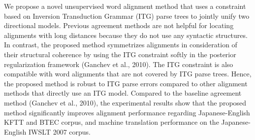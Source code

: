 We propose a novel unsupervised word alignment method that uses a constraint based on Inversion Transduction Grammar (ITG) parse trees to jointly unify two directional models. Previous agreement methods are not helpful for locating alignments with long distances because they do not use any syntactic structures. In contrast, the proposed method symmetrizes alignments in consideration of their structural coherence by using the ITG constraint softly in the posterior regularization framework (Ganchev et al., 2010). The ITG constraint is also compatible with word alignments that are not covered by ITG parse trees. Hence, the proposed method is robust to ITG parse errors compared to other alignment methods that directly use an ITG model. Compared to the baseline agreement method (Ganchev et al., 2010), the experimental results show that the proposed method significantly improves alignment performance regarding Japanese-English KFTT and BTEC corpus, and machine translation performance on the Japanese-English IWSLT 2007 corpus.
